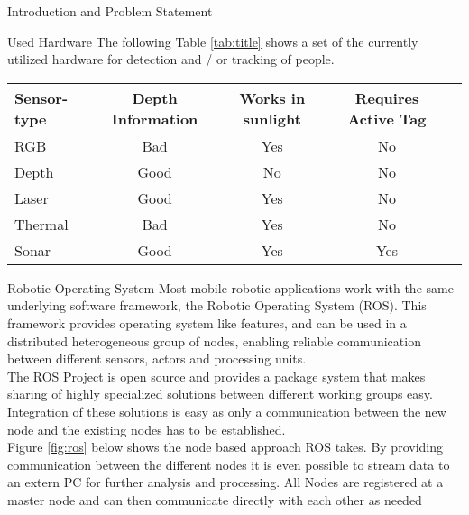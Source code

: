 \documentclass[a4paper,oneside,10pt,DIV12,headsepline,footexclude,headexclude]{scrartcl}
\begin{document}
\begin{section}{Introduction and Problem Statement}
\begin{subsection}{Used Hardware}
The following Table \ref{tab:title} shows a set of the currently utilized hardware for detection
and / or tracking of people.\\
\begin{minipage}{\linewidth}
\bigskip
\centering
\begin{tabular}{l | c c c c}
    \hline
    Sensor-type  & Depth Information & Works in sunlight & Requires Active Tag &    \\
    \hline
    RGB         & Bad   & Yes       & No &   \\
    Depth       & Good  & No        & No &   \\
    Laser       & Good  & Yes       & No &   \\
    Thermal     & Bad   & Yes       & No &   \\
    Sonar       & Good  & Yes       & Yes &  \\
    \hline
\end{tabular}\par
{} \label{tab:title} 
\end{minipage}
\end{subsection}

\begin{subsection}{Robotic Operating System}
Most mobile robotic applications work with the same underlying software framework, the Robotic 
Operating System (ROS). This framework provides operating system like features,
and can be used in a distributed heterogeneous group of nodes, enabling reliable 
communication between different sensors, actors and processing units.\\
The ROS Project is open source and provides a package system that makes sharing
of highly specialized solutions between different working groups easy.
Integration of these solutions is easy as only a communication between the new
node and the existing nodes has to be established. \\
Figure \ref{fig:ros} below shows the node based approach ROS takes.
By providing communication between the different nodes it is even possible to 
stream data to an extern PC for further analysis and processing. All Nodes are
registered at a master node and can then communicate directly with each other
as needed ~\cite{RosDoku}\\


\end{subsection}
\end{section}
\end{document}
